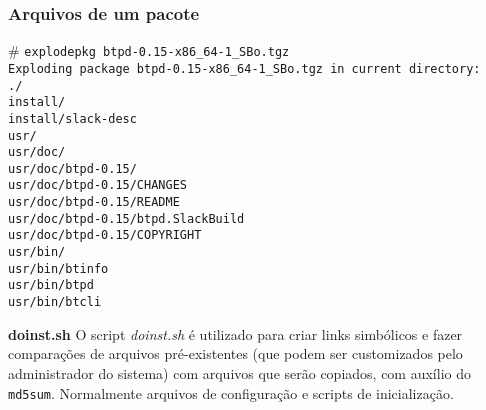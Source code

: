 \documentclass[aspectratio=169]{beamer}
\begin{document}
\begin{frame}
	\frametitle{Arquivos de um pacote}
	\scriptsize{
	\# \texttt{explodepkg btpd-0.15-x86\_64-1\_SBo.tgz\\
	Exploding package btpd-0.15-x86\_64-1\_SBo.tgz in current directory:\\
	./\\
	install/\\
	install/slack-desc\\
	usr/\\
	usr/doc/\\
	usr/doc/btpd-0.15/\\
	usr/doc/btpd-0.15/CHANGES\\
	usr/doc/btpd-0.15/README\\
	usr/doc/btpd-0.15/btpd.SlackBuild\\
	usr/doc/btpd-0.15/COPYRIGHT\\
	usr/bin/\\
	usr/bin/btinfo\\
	usr/bin/btpd\\
	usr/bin/btcli\\
	}}
	\begin{block}{\bf{doinst.sh}}
	O script \textit{doinst.sh} é utilizado para criar links simbólicos e fazer
	comparações de arquivos pré-existentes (que podem ser customizados pelo
	administrador do sistema) com arquivos que serão copiados, com auxílio do
	\texttt{md5sum}. Normalmente arquivos de configuração e scripts de inicialização.
	\end{block}
\end{frame}
\end{document}
